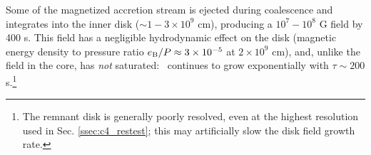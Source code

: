 
Some of the magnetized accretion stream is ejected during coalescence and integrates into the inner disk ($\sim1 - 3\times10^9$ cm), producing a $10^7 - 10^8$ G field by 400 s.  This field has a negligible hydrodynamic effect on the disk (magnetic energy density to pressure ratio $e_\mathrm{B}/P \approx 3\times10^{-5}$ at $2\times10^9$ cm), and, unlike the field in the core, has \textit{not} saturated: \Bmag\ continues to grow exponentially with $\tau \sim 200$ s.\footnote{The remnant disk is generally poorly resolved, even at the highest resolution used in Sec. \ref{ssec:c4_restest}; this may artificially slow the disk field growth rate.}
